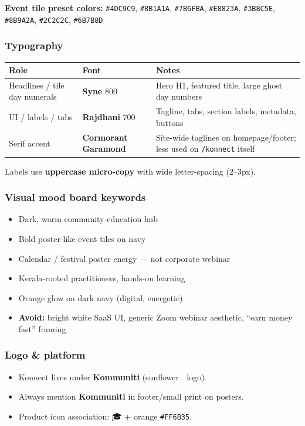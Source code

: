\documentclass[11pt,a4paper]{report}
\begin{document}
\textbf{Event tile preset colors:} \texttt{\#4DC9C9}, \texttt{\#8B1A1A}, \texttt{\#7B6FBA}, \texttt{\#E8823A}, \texttt{\#3B8C5E}, \texttt{\#8B9A2A}, \texttt{\#2C2C2C}, \texttt{\#6B7B8D}


\subsubsection{Typography}

\begin{longtable}{|l|l|l|}
\hline
Role & Font & Notes \\ \hline
Headlines / tile day numerals & \textbf{Syne} 800 & Hero H1, featured title, large ghost day numbers \\ \hline
UI / labels / tabs & \textbf{Rajdhani} 700 & Tagline, tabs, section labels, metadata, buttons \\ \hline
Serif accent & \textbf{Cormorant Garamond} & Site-wide taglines on homepage/footer; less used on \texttt{/konnect} itself \\
\hline
\end{longtable}


Labels use \textbf{uppercase micro-copy} with wide letter-spacing (2--3px).


\subsubsection{Visual mood board keywords}

\begin{itemize}
  \item Dark, warm community-education hub
  \item Bold poster-like event tiles on navy
  \item Calendar / festival poster energy --- not corporate webinar
  \item Kerala-rooted practitioners, hands-on learning
  \item Orange glow on dark navy (digital, energetic)
  \item \textbf{Avoid:} bright white SaaS UI, generic Zoom webinar aesthetic, “earn money fast” framing
\end{itemize}

\subsubsection{Logo \& platform}

\begin{itemize}
  \item Konnect lives under \textbf{Kommuniti} (sunflower 🌻 logo).
  \item Always mention \textbf{Kommuniti} in footer/small print on posters.
  \item Product icon association: 🎓 + orange \texttt{\#FF6B35}.
\end{itemize}
\end{document}
